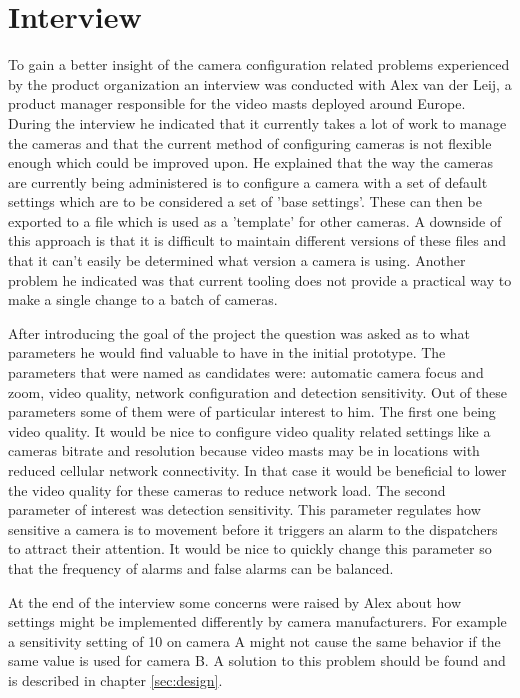 \section{Interview}
To gain a better insight of the camera configuration related problems experienced by the product organization an interview was conducted with Alex van der Leij, a product manager responsible for the video masts deployed around Europe.
During the interview he indicated that it currently takes a lot of work to manage
the cameras and that the current method of configuring cameras is not flexible enough which could be improved upon. He explained that the way the cameras are currently being
administered is to configure a camera with a set of default settings which are to be considered a set of 'base settings'. These can then be exported to a file which is used as a
'template' for other
cameras. A downside of this approach is that it is difficult to maintain different versions of these files and that it can't easily be determined what version a camera is using.
Another problem he indicated was that current tooling does not provide a practical way to make a single change to a batch of cameras.


After introducing the goal of the project the question was asked as to what parameters he would find valuable to have in the initial prototype.
The parameters that were named as candidates were: automatic camera focus and zoom, video quality, network configuration and detection sensitivity.
Out of these parameters some of them were of particular interest to him. The first one being video quality. It would be nice to configure video quality related settings like a
cameras bitrate and resolution because video masts may be in locations with reduced cellular network connectivity. In that case it would be beneficial to lower the video quality
for these cameras to reduce network load. The second parameter of interest was detection sensitivity. This parameter regulates how sensitive a camera is to movement before it
triggers an alarm to the dispatchers to attract their attention. It would be nice to quickly change this parameter so that the frequency of alarms and false alarms can be balanced.


At the end of the interview some concerns were raised by Alex about how settings might be implemented differently by camera manufacturers. For example a sensitivity setting of 10
on camera A might not cause the same behavior if the same value is used for camera B. A solution to this problem should be found and is described in chapter \ref{sec:design}.

